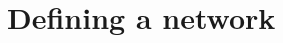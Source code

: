\documentclass[8pt]{beamer}
\begin{document}




\section{Defining a network}


\bgroup
{}
\begin{frame}[plain]{}
\begin{center}
\color{white}{\Huge\insertsection}
\end{center}
\end{frame}
\egroup

\end{document}
